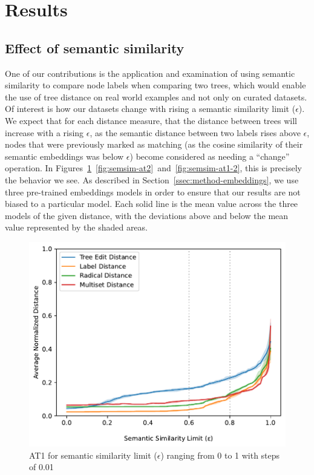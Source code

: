 \section{Results}
\label{sec:results}



\subsection{Effect of semantic similarity}

One of our contributions is the application and examination of using semantic similarity to compare node labels when comparing two trees, which would enable the use of tree distance on real world examples and not only on curated datasets. Of interest is how our datasets change with rising a semantic similarity limit ($\epsilon$). We expect that for each distance measure, that the distance between trees will increase with a rising $\epsilon$, as the semantic distance between two labels rises above $\epsilon$, nodes that were previously marked as matching (as the cosine similarity of their semantic embeddings was below $\epsilon$) become considered as needing a ``change'' operation. In Figures~\ref{fig:semsim-at1}~\ref{fig:semsim-at2}~and~\ref{fig:semsim-at1-2}, this is precisely the behavior we see. As described in Section~\ref{ssec:method-embeddings}, we use three pre-trained embeddings models in order to ensure that our results are not biased to a particular model. Each solid line is the mean value across the three models of the given distance, with the deviations above and below the mean value represented by the shaded areas.


\begin{figure}
    \includegraphics[width=\linewidth]{code/img/similaritylimits_at1_percentage.pdf}
    \caption{AT1 for semantic similarity limit ($\epsilon$) ranging from 0 to 1 with steps of 0.01}
    \label{fig:semsim-at1}
\end{figure}

